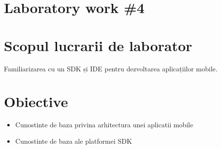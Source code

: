 \section*{Laboratory work \#4}

\section{Scopul lucrarii de laborator}

Familiarizarea cu un SDK și IDE pentru dezvoltarea aplicațiilor mobile.

\section{Obiective}

\begin{itemize}
 \item Cunostinte de baza privina arhitectura unei aplicatii mobile
 \item Cunostinte de baza ale platformei SDK
\end{itemize}

\clearpage